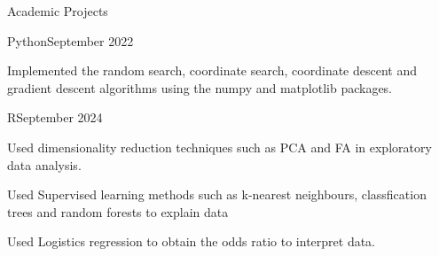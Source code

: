 \documentclass[
	11pt, %
]{resume} %
\begin{document}
\begin{rSection}{Academic Projects}

	\begin{rSubsection}{Python}{September 2022}{}{}
		\item Implemented the random search, coordinate search, coordinate descent and gradient descent algorithms using the numpy and matplotlib packages.
	\end{rSubsection}




	\begin{rSubsection}{R}{September 2024}{}{}
		\item Used dimensionality reduction techniques such as PCA and FA in exploratory data analysis.
		\item Used Supervised learning methods such as k-nearest neighbours, classfication trees and random forests to explain data
		\item Used Logistics regression to obtain the odds ratio to interpret data.

	\end{rSubsection}
	

	
	


	

\end{rSection}
\end{document}
